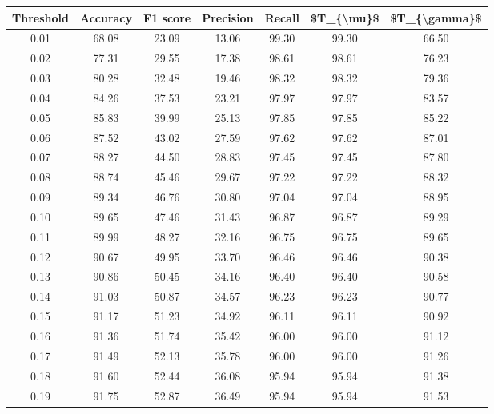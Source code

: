 \begin{tabular}{|c|c|c|c|c|c|c|}
\toprule
 Threshold &  Accuracy &  F1 score &  Precision &  Recall &  \$T\_\{\textbackslash mu\}\$ &  \$T\_\{\textbackslash gamma\}\$ \\
\hline
      0.01 &     68.08 &     23.09 &      13.06 &   99.30 &      99.30 &         66.50 \\
      0.02 &     77.31 &     29.55 &      17.38 &   98.61 &      98.61 &         76.23 \\
      0.03 &     80.28 &     32.48 &      19.46 &   98.32 &      98.32 &         79.36 \\
      0.04 &     84.26 &     37.53 &      23.21 &   97.97 &      97.97 &         83.57 \\
      0.05 &     85.83 &     39.99 &      25.13 &   97.85 &      97.85 &         85.22 \\
      0.06 &     87.52 &     43.02 &      27.59 &   97.62 &      97.62 &         87.01 \\
      0.07 &     88.27 &     44.50 &      28.83 &   97.45 &      97.45 &         87.80 \\
      0.08 &     88.74 &     45.46 &      29.67 &   97.22 &      97.22 &         88.32 \\
      0.09 &     89.34 &     46.76 &      30.80 &   97.04 &      97.04 &         88.95 \\
      0.10 &     89.65 &     47.46 &      31.43 &   96.87 &      96.87 &         89.29 \\
      0.11 &     89.99 &     48.27 &      32.16 &   96.75 &      96.75 &         89.65 \\
      0.12 &     90.67 &     49.95 &      33.70 &   96.46 &      96.46 &         90.38 \\
      0.13 &     90.86 &     50.45 &      34.16 &   96.40 &      96.40 &         90.58 \\
      0.14 &     91.03 &     50.87 &      34.57 &   96.23 &      96.23 &         90.77 \\
      0.15 &     91.17 &     51.23 &      34.92 &   96.11 &      96.11 &         90.92 \\
      0.16 &     91.36 &     51.74 &      35.42 &   96.00 &      96.00 &         91.12 \\
      0.17 &     91.49 &     52.13 &      35.78 &   96.00 &      96.00 &         91.26 \\
      0.18 &     91.60 &     52.44 &      36.08 &   95.94 &      95.94 &         91.38 \\
      0.19 &     91.75 &     52.87 &      36.49 &   95.94 &      95.94 &         91.53 \\

\end{tabular}
